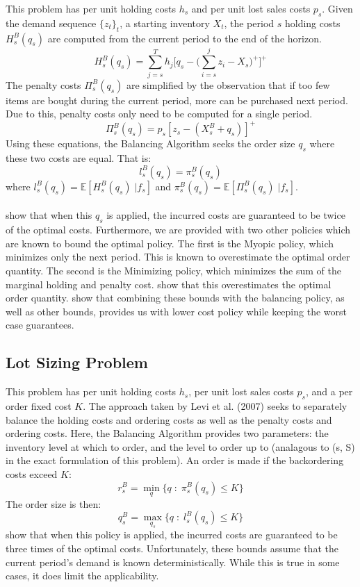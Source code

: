 \documentclass[12pt]{article}
\newcommand{\EX}{\mathbb{E}}
\begin{document}
This problem has per unit holding costs $h_s$ and per unit lost sales costs $p_s$. Given the demand sequence $\{z_t\}_t$, a starting inventory $X_t$, the period $s$ holding costs $H^B_s(q_s)$ are computed from the current period to the end of the horizon. 
$$
	H_s^B(q_s) = \sum_{j=s}^T h_j \big[q_s - \big(\sum_{i=s}^j z_i - X_s\big)^+\big]^+
$$
The penalty costs $\Pi_s^B(q_s)$ are simplified by the observation that if too few items are bought during the current period, more can be purchased next period. Due to this, penalty costs only need to be computed for a single period.
$$
	\Pi_s^B(q_s) =  p_s [z_s - (X_s^B + q_s)]^+ 
$$
Using these equations, the Balancing Algorithm seeks the order size $q_s$ where these two costs are equal. That is:
$$
	l_s^B(q_s) = \pi_s^B(q_s)
$$
where $l_s^B(q_s) = \EX[H_s^B(q_s) \; | f_s]$ and $\pi_s^B(q_s) = \EX[\Pi_s^B(q_s) \; | f_s]$. \\
\\
\cite{levi:2007} show that when this $q_s$ is applied, the incurred costs are guaranteed to be twice of the optimal costs. Furthermore, we are provided with two other policies which are known to bound the optimal policy. The first is the Myopic policy, which minimizes only the next period. This is known to overestimate the optimal order quantity. The second is the Minimizing policy, which minimizes the sum of the marginal holding and penalty cost. \cite{levi:2007} show that this overestimates the optimal order quantity. \cite{hurley:2007} show that combining these bounds with the balancing policy, as well as other bounds, provides us with lower cost policy while keeping the worst case guarantees.  

\subsection{Lot Sizing Problem}

This problem has per unit holding costs $h_s$, per unit lost sales costs $p_s$, and a per order fixed cost $K$. The approach taken by Levi et al. (2007) seeks to separately balance the holding costs and ordering costs as well as the penalty costs and ordering costs. Here, the Balancing Algorithm provides two parameters: the inventory level at which to order, and the level to order up to (analagous to (s, S) in the exact formulation of this problem). An order is made if the backordering costs exceed $K$:
$$
	r_s^B = \min_{q} \{q \; : \; \pi_s^B(q_s) \leq K\} 
$$
The order size is then:
$$
	q_s^B = \max_{q_s} \{q \; : \; l_s^B(q_s) \leq K\} 
$$
\cite{levi:2007} show that when this policy is applied, the incurred costs are guaranteed to be three times of the optimal costs. Unfortunately, these bounds assume that the current period's demand is known deterministically. While this is true in some cases, it does limit the applicability.
\end{document}
